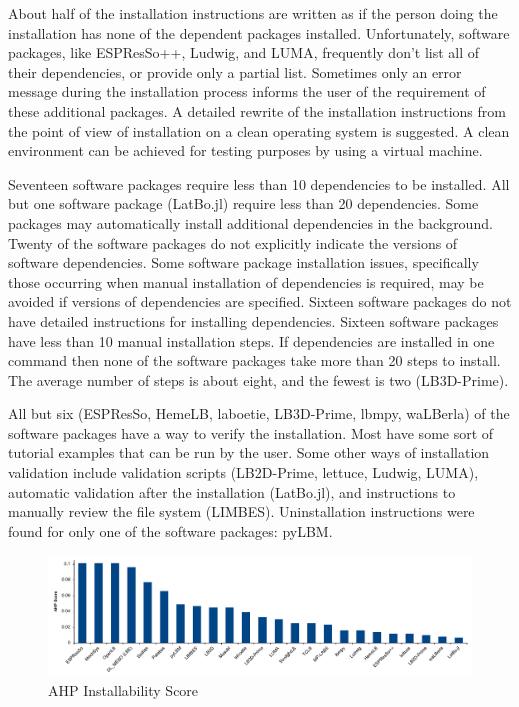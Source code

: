 \documentclass[final, 3p, times, authoryear]{elsarticle}
\begin{document}
About half of the installation instructions are written as if the person doing
the installation has none of the dependent packages installed. Unfortunately,
software packages, like ESPResSo++, Ludwig, and LUMA, frequently don't list all
of their dependencies, or provide only a partial list. Sometimes only an error
message during the installation process informs the user of the requirement of
these additional packages. A detailed rewrite of the installation instructions
from the point of view of installation on a clean operating system is suggested.
A clean environment can be achieved for testing purposes by using a virtual
machine.

Seventeen software packages require less than 10 dependencies to be installed.
All but one software package (LatBo.jl) require less than 20 dependencies. Some
packages may automatically install additional dependencies in the background.
Twenty of the software packages do not explicitly indicate the versions of
software dependencies. Some software package installation issues, specifically
those occurring when manual installation of dependencies is required, may be
avoided if versions of dependencies are specified. Sixteen software packages do
not have detailed instructions for installing dependencies. Sixteen software
packages have less than 10 manual installation steps. If dependencies are
installed in one command then none of the software packages take more than 20
steps to install. The average number of steps is about eight, and the fewest is
two (LB3D-Prime). 

All but six (ESPResSo, HemeLB, laboetie, LB3D-Prime, lbmpy, waLBerla) of the
software packages have a way to verify the installation. Most have some sort of
tutorial examples that can be run by the user. Some other ways of installation
validation include validation scripts (LB2D-Prime, lettuce, Ludwig, LUMA),
automatic validation after the installation (LatBo.jl), and instructions to
manually review the file system (LIMBES).  Uninstallation instructions were
found for only one of the software packages: pyLBM.

\begin{figure}[h!]
	\begin{center}
		\includegraphics[width=1.0\textwidth]{./figures/installability_chart.pdf}
		\caption{AHP Installability Score}
		\label{Fig_Installability}
	\end{center}
\end{figure}
\end{document}
